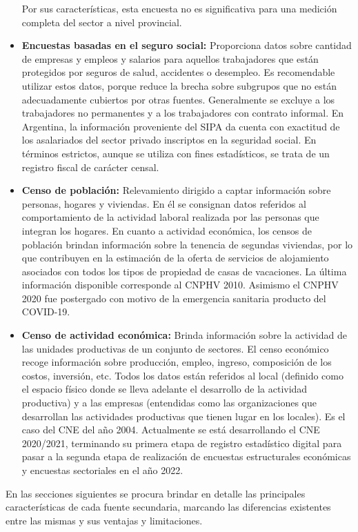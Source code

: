 \documentclass[
  openany]{book}
\begin{document}
\begin{itemize}
  Por sus características, esta encuesta no es significativa para una medición completa del sector a nivel provincial.
\item
  \textbf{Encuestas basadas en el seguro social:} Proporciona datos sobre cantidad de empresas y empleos y salarios para aquellos trabajadores que están protegidos por seguros de salud, accidentes o desempleo.
  Es recomendable utilizar estos datos, porque reduce la brecha sobre subgrupos que no están adecuadamente cubiertos por otras fuentes.
  Generalmente se excluye a los trabajadores no permanentes y a los trabajadores con contrato informal.
  En Argentina, la información proveniente del SIPA da cuenta con exactitud de los asalariados del sector privado inscriptos en la seguridad social.
  En términos estrictos, aunque se utiliza con fines estadísticos, se trata de un registro fiscal de carácter censal.
\item
  \textbf{Censo de población:} Relevamiento dirigido a captar información sobre personas, hogares y viviendas.
  En él se consignan datos referidos al comportamiento de la actividad laboral realizada por las personas que integran los hogares.
  En cuanto a actividad económica, los censos de población brindan información sobre la tenencia de segundas viviendas, por lo que contribuyen en la estimación de la oferta de servicios de alojamiento asociados con todos los tipos de propiedad de casas de vacaciones.
  La última información disponible corresponde al CNPHV 2010.
  Asimismo el CNPHV 2020 fue postergado con motivo de la emergencia sanitaria producto del COVID-19.
\item
  \textbf{Censo de actividad económica:} Brinda información sobre la actividad de las unidades productivas de un conjunto de sectores.
  El censo económico recoge información sobre producción, empleo, ingreso, composición de los costos, inversión, etc.
  Todos los datos están referidos al local (definido como el espacio físico donde se lleva adelante el desarrollo de la actividad productiva) y a las empresas (entendidas como las organizaciones que desarrollan las actividades productivas que tienen lugar en los locales).
  Es el caso del CNE del año 2004.
  Actualmente se está desarrollando el CNE 2020/2021, terminando su primera etapa de registro estadístico digital para pasar a la segunda etapa de realización de encuestas estructurales económicas y encuestas sectoriales en el año 2022.
\end{itemize}

En las secciones siguientes se procura brindar en detalle las principales características de cada fuente secundaria, marcando las diferencias existentes entre las mismas y sus ventajas y limitaciones.
\end{document}
